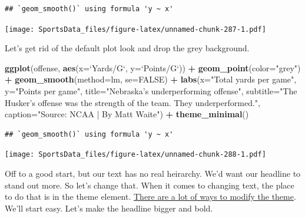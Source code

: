 \documentclass[
]{book}
\newenvironment{Shaded}{\begin{snugshade}}{\end{snugshade}}
\newcommand{\DataTypeTok}[1]{\textcolor[rgb]{0.13,0.29,0.53}{#1}}
\newcommand{\KeywordTok}[1]{\textcolor[rgb]{0.13,0.29,0.53}{\textbf{#1}}}
\newcommand{\NormalTok}[1]{#1}
\newcommand{\OperatorTok}[1]{\textcolor[rgb]{0.81,0.36,0.00}{\textbf{#1}}}
\newcommand{\OtherTok}[1]{\textcolor[rgb]{0.56,0.35,0.01}{#1}}
\newcommand{\StringTok}[1]{\textcolor[rgb]{0.31,0.60,0.02}{#1}}
\begin{document}
\begin{verbatim}
## `geom_smooth()` using formula 'y ~ x'
\end{verbatim}

\texttt{[image: SportsData\_files/figure-latex/unnamed-chunk-287-1.pdf]}

Let's get rid of the default plot look and drop the grey background.

\begin{Shaded}
\begin{Highlighting}[]
\KeywordTok{ggplot}\NormalTok{(offense, }\KeywordTok{aes}\NormalTok{(}\DataTypeTok{x=}\StringTok{`}\DataTypeTok{Yards/G}\StringTok{`}\NormalTok{, }\DataTypeTok{y=}\StringTok{`}\DataTypeTok{Points/G}\StringTok{`}\NormalTok{)) }\OperatorTok{+}\StringTok{ }
\StringTok{  }\KeywordTok{geom_point}\NormalTok{(}\DataTypeTok{color=}\StringTok{"grey"}\NormalTok{) }\OperatorTok{+}\StringTok{ }\KeywordTok{geom_smooth}\NormalTok{(}\DataTypeTok{method=}\NormalTok{lm, }\DataTypeTok{se=}\OtherTok{FALSE}\NormalTok{) }\OperatorTok{+}\StringTok{ }
\StringTok{  }\KeywordTok{labs}\NormalTok{(}\DataTypeTok{x=}\StringTok{"Total yards per game"}\NormalTok{, }\DataTypeTok{y=}\StringTok{"Points per game"}\NormalTok{, }\DataTypeTok{title=}\StringTok{"Nebraska's underperforming offense"}\NormalTok{, }\DataTypeTok{subtitle=}\StringTok{"The Husker's offense was the strength of the team. They underperformed."}\NormalTok{, }\DataTypeTok{caption=}\StringTok{"Source: NCAA | By Matt Waite"}\NormalTok{) }\OperatorTok{+}\StringTok{ }
\StringTok{  }\KeywordTok{theme_minimal}\NormalTok{()}
\end{Highlighting}
\end{Shaded}

\begin{verbatim}
## `geom_smooth()` using formula 'y ~ x'
\end{verbatim}

\texttt{[image: SportsData\_files/figure-latex/unnamed-chunk-288-1.pdf]}

Off to a good start, but our text has no real heirarchy. We'd want our headline to stand out more. So let's change that. When it comes to changing text, the place to do that is in the theme element. \href{http://ggplot2.tidyverse.org/reference/theme.html}{There are a lot of ways to modify the theme}. We'll start easy. Let's make the headline bigger and bold.
\end{document}
